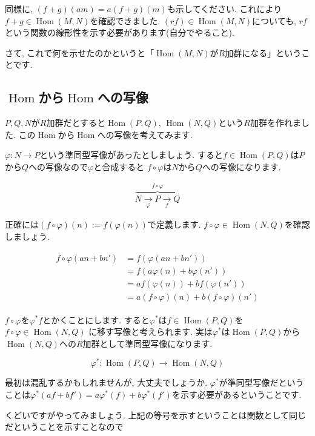 \documentclass{jsarticle}
\newcommand{\makeop}[1]{\mathop{\mathrm{#1}}\nolimits}
\def\Hom{\makeop{Hom}}
\theoremstyle{definition}
\numberwithin{theorem}{section}
\begin{document}
同様に, $(f+g)(am) = a(f+g)(m)$も示してください. これにより$f+g \in \Hom(M, N)$を確認できました. $(rf) \in \Hom(M, N)$についても, 
$rf$という関数の線形性を示す必要があります(自分でやること).

さて, これで何を示せたのかというと「$\Hom(M, N)$が$R$加群になる」ということです.

\subsection{$\Hom$から$\Hom$への写像}
$P, Q, N$が$R$加群だとすると$\Hom(P, Q)$, $\Hom(N, Q)$という$R$加群を作れました. この$\Hom$から$\Hom$への写像を考えてみます.

$\varphi: N \rightarrow P$という準同型写像があったとしましょう. すると$f \in \Hom(P, Q)$は$P$から$Q$への写像なので$\varphi$と合成すると
$f\circ \varphi$は$N$から$Q$への写像になります. 

\begin{eqnarray*}
\overbrace{N \xrightarrow[\varphi]{} P \xrightarrow[f]{} Q}^{\displaystyle f \circ \varphi}
\end{eqnarray*}

正確には$(f\circ \varphi)(n) := f(\varphi(n))$で定義します. $f\circ \varphi \in \Hom(N, Q)$を確認しましょう. 

\begin{eqnarray*}
\begin{aligned}
f\circ \varphi(an+bn') &= f(\varphi(an+bn'))\\
&= f(a\varphi(n) + b\varphi(n'))\\
&= af(\varphi(n)) + bf(\varphi(n'))\\
&= a(f\circ \varphi)(n) + b(f \circ \varphi)(n')
\end{aligned}
\end{eqnarray*}

$f\circ \varphi$を$\varphi^*f$とかくことにします. すると$\varphi^*$は$f \in \Hom(P, Q)$を$f\circ\varphi \in \Hom(N, Q)$
に移す写像と考えられます. 実は$\varphi^*$は$\Hom(P, Q)$から$\Hom(N, Q)$への$R$加群として準同型写像になります.

$$
\varphi^*: \Hom(P, Q) \rightarrow \Hom(N, Q)
$$

最初は混乱するかもしれませんが, 大丈夫でしょうか. $\varphi^*$が準同型写像だということは$\varphi^*(af+bf') = a\varphi^*(f) + b\varphi^*(f')$を示す必要があるということです.

くどいですがやってみましょう. 上記の等号を示すということは関数として同じだということを示すことなので
\end{document}
